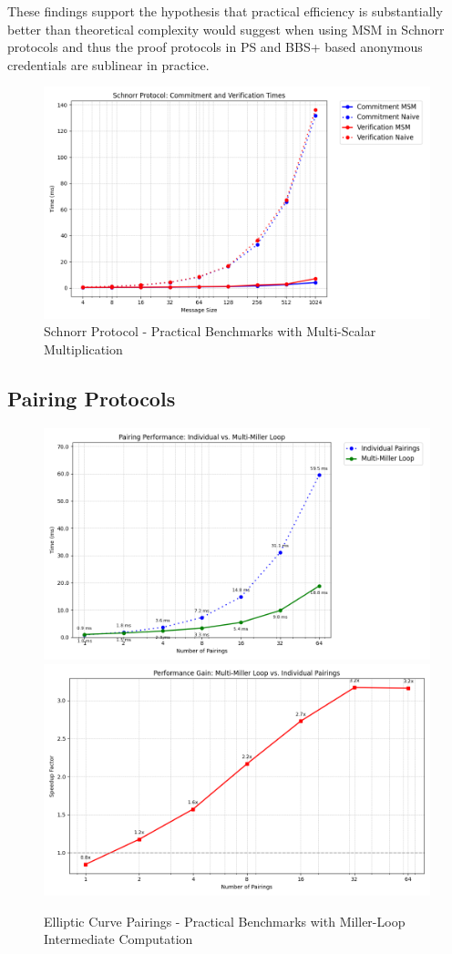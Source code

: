 These findings support the hypothesis that practical efficiency is substantially better than theoretical complexity would suggest when using MSM in Schnorr protocols and thus the proof protocols in PS and BBS+ based anonymous credentials are sublinear in practice.

\begin{figure}
    \centering
    \includegraphics[width=0.75\linewidth]{schnorr_msm_no_msm.png}
    \caption{Schnorr Protocol - Practical Benchmarks with Multi-Scalar Multiplication}
    \label{fig:schnorr-benchmarks}
\end{figure}




\subsection{Pairing Protocols}

\begin{figure}
    \centering
    \includegraphics[width=0.75\linewidth]{pairing_comparison.png}
        \includegraphics[width=0.75\linewidth]{pairing_comparison2.png}
    \caption{Elliptic Curve Pairings - Practical Benchmarks with Miller-Loop Intermediate Computation}
    \label{fig:enter-label}
\end{figure}
